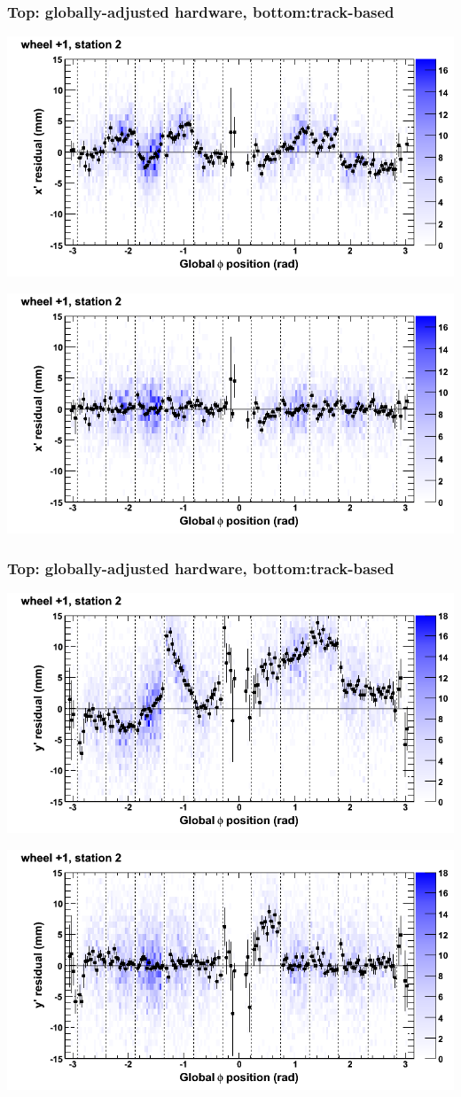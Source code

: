 \documentclass[compress]{beamer}
\begin{document}
\begin{frame}
\frametitle{Top: globally-adjusted hardware, bottom:track-based}
\includegraphics[width=0.7\linewidth]{NOV4_mapplots_HW/DTvsphi_st2whD_x.png}

\includegraphics[width=0.7\linewidth]{NOV4_mapplots/DTvsphi_st2whD_x.png}
\end{frame}

\begin{frame}
\frametitle{Top: globally-adjusted hardware, bottom:track-based}
\includegraphics[width=0.7\linewidth]{NOV4_mapplots_HW/DTvsphi_st2whD_y.png}

\includegraphics[width=0.7\linewidth]{NOV4_mapplots/DTvsphi_st2whD_y.png}
\end{frame}
\end{document}
